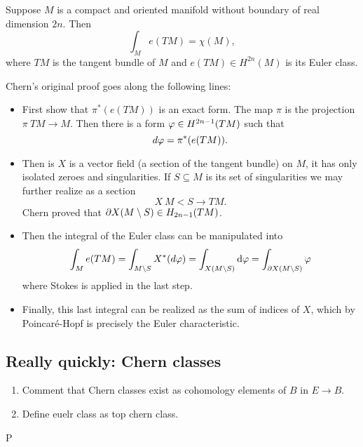 \documentclass[12pt]{memoir}
\def\nextra {P}
\begin{document}
\begin{Th}
Suppose $M$ is a compact and oriented manifold without boundary of real dimension $2n$. Then 
$$\int_Me(TM)=\chi(M),$$
where $TM$ is the tangent bundle of $M$ and $e(TM)\in H^{2n}(M)$ is its Euler class.
\end{Th}

Chern's original proof goes along the following lines:
\begin{itemize}
    \item First show that $\pi^\ast(e(TM))$ is an exact form. The map $\pi$ is the projection $\pi\: TM\to M$. Then there is a form $\varphi\in H^{2n-1}(TM)$ such that 
    $$d\varphi=\pi^\ast(e(TM)).$$
    \item Then is $X$ is a vector field (a section of the tangent bundle) on $M$, it has only isolated zeroes and singularities. If $S\subseteq M$ is its set of singularities we may further realize as a section
    $$X\:M\less S\to TM.$$
    Chern proved that $\partial X(M\setminus S)\in H_{2n-1}(TM)$.
    \item Then the integral of the Euler class can be manipulated into
    $$\int_Me(TM)=\int_{M\setminus S}X^\ast(d\varphi)=\int_{X(M\setminus S)}\dd\varphi=\int_{\partial X(M\setminus S)}\varphi$$
    where Stokes is applied in the last step.
    \item Finally, this last integral can be realized as the sum of indices of $X$, which by Poincaré-Hopf is precisely the Euler characteristic.
\end{itemize}

\subsection{Really quickly: Chern classes}

\begin{enumerate}
    \item Comment that Chern classes exist as cohomology elements of $B$ in $E\to B$. 
    \item Define euelr class as top chern class.
\end{enumerate}


\ifx\nextra\undefined
\printindex
\else\fi
\nocite{*}


\end{document}
